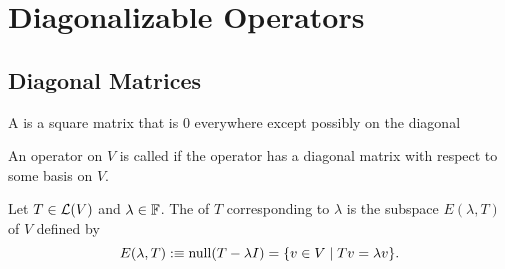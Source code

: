 \section{Diagonalizable Operators}
\subsection{Diagonal Matrices}

\setcounter{thm}{47}
\begin{mydef} 
  A  is a square matrix that is $0$ everywhere except possibly on \nopagebreak the diagonal
\end{mydef}

\setcounter{thm}{49}
\begin{mydef} [diagonalizable]
  An operator on $V$ is called  if the operator has a diagonal matrix with respect to some basis on $V$.
\end{mydef}

\setcounter{thm}{51}
\label{eigenspace}
\begin{mydef} 
  Let $T \in \mathcal{L}(V)$ and $\lambda \in \mathbb{F}$. The  of $T$ corresponding to $\lambda$ is the subspace $E(\lambda, T)$ of $V$ defined by
  \begin{equation}
    E(\lambda, T) :\equiv  \operatorname{null}(T-\lambda I) = \{ v\in V \mid Tv = \lambda v\}.
  \end{equation}
\end{mydef}

